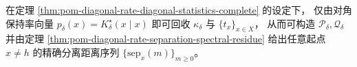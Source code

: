 \begin{corollary}[单次对角观测确定分离距离剖面]\label{cor:pom-diagonal-rate-diagonal-determines-separation-profile}
在定理 \ref{thm:pom-diagonal-rate-diagonal-statistics-complete} 的设定下，
仅由对角保持率向量 \(p_\delta(x)=K^\star_\delta(x\mid x)\) 即可回收 \(\kappa_\delta\) 与 \(\{t_x\}_{x\in X}\)，
从而可构造 \(\mathcal P_\delta,\mathcal Q_\delta\) 并由定理 \ref{thm:pom-diagonal-rate-separation-spectral-residue} 给出任意起点 \(x\ne h\) 的精确分离距离序列 \(\{\mathrm{sep}_x(m)\}_{m\ge 0}\)。
\end{corollary}
